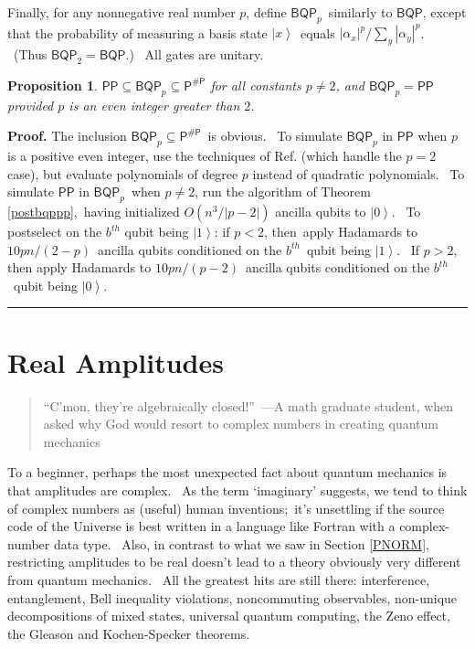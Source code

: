 \documentclass{article}%
\newtheorem{proposition}[theorem]{Proposition}
\newenvironment{proof}[1][Proof]{\noindent\textbf{#1.} }{\ \rule{0.5em}{0.5em}}
\begin{document}
Finally, for any nonnegative real number $p$, define $\mathsf{BQP}_{p}%
$\ similarly to $\mathsf{BQP}$, except that the probability of measuring a
basis state $\left\vert x\right\rangle $\ equals $\left\vert \alpha
_{x}\right\vert ^{p}/\sum_{y}\left\vert \alpha_{y}\right\vert ^{p}$. \ (Thus
$\mathsf{BQP}_{2}=\mathsf{BQP}$.) \ All gates are unitary.

\begin{proposition}
\label{bqpp}$\mathsf{PP}\subseteq\mathsf{BQP}_{p}\subseteq\mathsf{P}%
^{\mathsf{\#P}}$ for all constants $p\neq2$, and $\mathsf{BQP}_{p}%
=\mathsf{PP}$ provided $p$ is an even integer greater than $2$.
\end{proposition}

\begin{proof}
The inclusion $\mathsf{BQP}_{p}\subseteq\mathsf{P}^{\mathsf{\#P}}$\ is
obvious. \ To simulate $\mathsf{BQP}_{p}$ in $\mathsf{PP}$ when $p$ is a
positive even integer, use the techniques of Ref. \cite{adh} (which handle the
$p=2$ case), but evaluate polynomials of degree $p$ instead of quadratic
polynomials. \ To simulate $\mathsf{PP}$ in $\mathsf{BQP}_{p}$\ when $p\neq2$,
run the algorithm of Theorem \ref{postbqppp},\ having initialized $O\left(
n^{3}/\left\vert p-2\right\vert \right)  $ ancilla qubits to $\left\vert
0\right\rangle $. \ To postselect on the $b^{th}$ qubit being $\left\vert
1\right\rangle $: if $p<2$, then\ apply Hadamards to $10pn/\left(  2-p\right)
$\ ancilla qubits conditioned on the $b^{th}$\ qubit being $\left\vert
1\right\rangle $. \ If $p>2$, then apply Hadamards to $10pn/\left(
p-2\right)  $\ ancilla qubits conditioned on the $b^{th}$\ qubit being
$\left\vert 0\right\rangle $. \ 
\end{proof}

\section{Real Amplitudes\label{REAL}}

\begin{quote}
\textquotedblleft C'mon, they're algebraically closed!\textquotedblright\ ---A
math graduate student, when asked why God would resort to complex numbers in
creating quantum mechanics
\end{quote}

To a beginner, perhaps the most unexpected fact about quantum mechanics is
that amplitudes are complex. \ As the term `imaginary' suggests, we tend to
think of complex numbers as (useful) human inventions;\ it's unsettling if the
source code of the Universe is best written in a language like Fortran with a
complex-number data type. \ Also, in contrast to what we saw in Section
\ref{PNORM}, restricting amplitudes to be real doesn't lead to a theory
obviously very different from quantum mechanics. \ All the greatest hits are
still there: interference, entanglement, Bell inequality violations,
noncommuting observables, non-unique decompositions of mixed states, universal
quantum computing, the Zeno effect, the Gleason and Kochen-Specker theorems.
\end{document}
